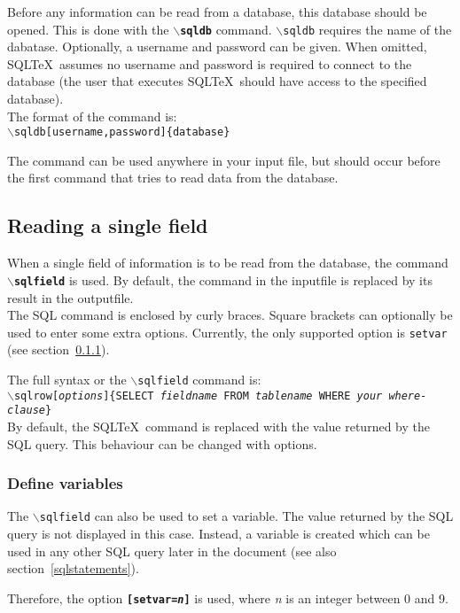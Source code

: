 \documentclass{article}
\newcommand{\bs}{\ensuremath{\backslash}}
\begin{document}
Before any information can be read from a database, this database should be opened.
This is done with the \texttt{\textbf{\bs sqldb}} command.
\texttt{\bs sqldb} requires the name of the dabatase. Optionally, a username and password can be given. When
omitted, SQL\TeX\ assumes no username and password is required to connect to the database (the user that
executes SQL\TeX\ should have access to the specified database). \\
The format of the command is:\\
\texttt{\bs sqldb[username,password]\{database\}}

The command can be used anywhere in your input file, but should occur before the first command that tries to
read data from the database.

\subsection{Reading a single field}\label{sqlfield}

When a single field of information is to be read from the database, the command \texttt{\textbf{\bs sqlfield}}
is used. By default, the command in the inputfile is replaced by its result in the outputfile.\\
The SQL command is enclosed by curly braces. Square brackets can optionally be used to enter some extra options.
Currently, the only supported option is \texttt{setvar} (see section~\ref{vars}).

The full syntax or the \texttt{\bs sqlfield} command is:\\
\texttt{\bs sqlrow[\textit{options}]\{SELECT \textit{fieldname} FROM \textit{tablename} WHERE \textit{your where-clause}\}} \\
By default, the SQL\TeX\ command is replaced with the value returned by the SQL query. This behaviour
can be changed with options.


\subsubsection{Define variables}\label{vars}

The \texttt{\bs sqlfield} can also be used to set a variable. The value returned by the SQL query is not
displayed in this case. Instead, a variable is created which can be used in any other SQL query later in
the document (see also section~\ref{sqlstatements}).

Therefore, the option \texttt{\textbf{[setvar=\textit{n}]}} is used, where \textit{n} is an integer between
0 and 9.
\end{document}

